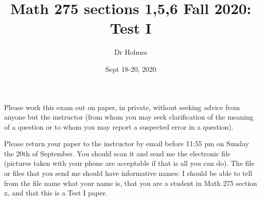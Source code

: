 \documentclass[12pt]{article}
\title{Math 275 sections 1,5,6 Fall 2020:  Test I}
\author{Dr Holmes}
\date{Sept 18-20, 2020}
\begin{document}
\maketitle

Please work this exam out on paper, in private, without seeking advice from anyone but the instructor (from whom you may seek clarification of the meaning of a question or to whom you may report  a suspected error in a question).

Please return your paper to the instructor by email before 11:55 pm on Sunday the 20th of September.  You should scan it and send me the electronic file (pictures taken with your phone are acceptable if that is all you can do).  The file or files that you send me should have informative names:  I should be able to tell from the file name what your name is, that you are a student in Math 275 section x, and that this is a Test I paper.

\newpage
\end{document}
